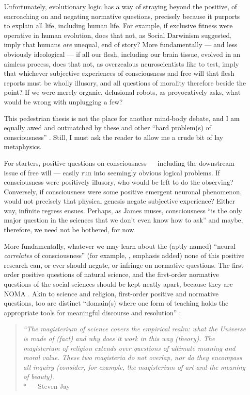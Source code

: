 Unfortunately, evolutionary logic has a way of straying beyond the positive, of encroaching on and negating normative questions, precisely because it purports to explain all life, including human life. 
For example, if exclusive fitness were operative in human evolution, does that not, as Social Darwinism suggested, imply that humans \emph{are} unequal, end of story? 
More fundamentally --- and less obviously ideological --- if all our flesh, including our brain tissue, evolved in an aimless process, does that not, as overzealous neuroscientists like to test, imply that whichever subjective experiences of consciousness and free will that flesh reports must be wholly illusory, and all questions of morality therefore beside the point? 
If we were merely organic, delusional robots, as \citet[Chapter 23]{Wright2000} provocatively asks, what would be wrong with unplugging a few?

This pedestrian thesis is not the place for another mind-body debate, and I am equally awed and outmatched by these and other ``hard problem(s) of consciousness''  \citep{Chalmers1995}. 
Still, I must ask the reader to allow me a crude bit of lay metaphysics. 

For starters, positive questions on consciousness --- including the downstream issue of free will --- easily run into seemingly obvious logical problems. 
If consciousness were positively illusory, who would be left to do the observing? 
Conversely, if consciousness were some positive emergent neuronal phenomenon, would not precisely that physical genesis negate subjective experience? 
Either way, infinite regress ensues. Perhaps, as James \citeauthor{Trefil1997} muses, consciousness ``is the only major question in the sciences that we don't even know how to ask'' \citeyearpar[15]{Trefil1997} and maybe, therefore, we need not be bothered, for now.

More fundamentally, whatever we may learn about the (aptly named) ``neural \emph{correlates} of consciousness'' (for example, \citealt{Koch2004}, emphasis added) none of this positive research can, or ever should negate, or infringe on normative questions. 
The first-order positive questions of natural science, and the first-order normative questions of the social sciences should be kept neatly apart, because they are \gls{NOMA} \citep{Gould1997}. 
Akin to science and religion, first-order positive and normative questions, too are distinct ``domain(s) where one form of teaching holds the appropriate tools for meaningful discourse and resolution'' \citep[3]{Gould2002}: 
\begin{quote}
	\emph{``The magisterium of science covers the empirical realm: what the Universe is made of (fact) and why does it work in this way (theory). The magisterium of religion extends over questions of ultimate meaning and moral value. These two magisteria do not overlap, nor do they encompass all inquiry (consider, for example, the magisterium of art and the meaning of beauty).}\\*
	--- Steven Jay \citet[6]{Gould2002} %
\end{quote} 

